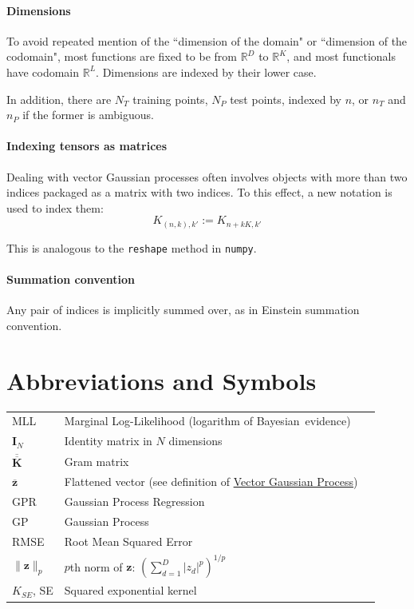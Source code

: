 \documentclass[12pt,a4paper,twoside]{report}
\theoremstyle{definition}
\begin{document}
\paragraph{Dimensions}To avoid repeated mention of the ``dimension of the domain" or ``dimension of the codomain", most functions are fixed to be from $\mathbb{R}^D$ to $\mathbb{R}^K$, and most functionals have codomain $\mathbb{R}^L$. Dimensions are indexed by their lower case.

In addition, there are $N_T$ training points, $N_P$ test points, indexed by $n$, or $n_T$ and $n_P$ if the former is ambiguous.

\paragraph{Indexing tensors as matrices}Dealing with vector Gaussian processes often involves objects with more than two indices packaged as a matrix with two indices. To this effect, a new notation is used to index them:
\begin{equation*}
K_{(n,k),k'}:=K_{n+kK,k'}
\end{equation*}

This is analogous to the \texttt{reshape} method in \texttt{numpy}.

\paragraph{Summation convention}Any pair of indices is implicitly summed over, as in Einstein summation convention.

\section{Abbreviations and Symbols}
\begin{tabular}{p{1.75cm}p{10cm}p{1cm}}
	MLL & \raggedright Marginal Log-Likelihood (logarithm of Bayesian~evidence) & \pageref{MLL}\\
	$\mathbf I_N$ & Identity matrix in $N$ dimensions & \\
	$\mathbf{\overline{\overline K}}$ & Gram matrix & \\
	$\mathbf{\overline z}$ & Flattened vector (see definition of \hyperref[vectorGP]{Vector Gaussian Process})\\
	GPR & Gaussian Process Regression & \\
	GP & Gaussian Process & \\
	RMSE & Root Mean Squared Error & \pageref{RMSE}\\
	$\|\mathbf z\|_p$ & $p$th norm of $\mathbf z$: $\left(\sum_{d=1}^D |z_d|^p\right)^{1/p}$  & \pageref{norm}\\ 
	$K_{SE}$, SE & Squared exponential kernel &\pageref{SE}\\
\end{tabular}
\end{document}
